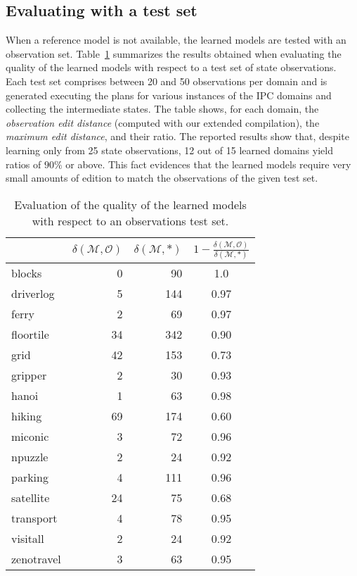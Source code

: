 \subsection{Evaluating with a test set}

When a reference model is not available, the learned models are tested with an observation set. Table~\ref{fig:observationstest} summarizes the results obtained when evaluating the quality of the learned models with respect to a test set of state observations. Each test set comprises between 20 and 50 observations per domain and is generated executing the plans for various instances of the IPC domains and collecting the intermediate states. The table shows, for each domain, the {\em observation edit distance} (computed with our extended compilation), the {\em maximum edit distance}, and their ratio. The reported results show that, despite learning only from 25 state observations, 12 out of 15 learned domains yield ratios of $90\%$ or above. This fact evidences that the learned models require very small amounts of edition to match the observations of the given test set.

\begin{table}[hbt!]
		\begin{center}
                \begin{footnotesize}
			\begin{tabular}{l|r|r|c|}
				& $\delta(\mathcal{M},\mathcal{O})$ & $\delta(\mathcal{M},*)$ & $1-\frac{\delta(\mathcal{M},\mathcal{O})}{\delta(\mathcal{M},*)}$ \\
				\hline
				blocks & 0 & 90 & 1.0 \\
				driverlog & 5 & 144 & 0.97 \\
				ferry & 2 & 69 & 0.97 \\
				floortile & 34 & 342 & 0.90 \\
				grid & 42 & 153 & 0.73 \\
				gripper & 2 & 30 & 0.93 \\
				hanoi & 1 & 63 & 0.98 \\
				hiking & 69 & 174 & 0.60 \\
				miconic & 3 & 72 & 0.96 \\
				npuzzle & 2 & 24 & 0.92 \\
                                parking & 4 & 111 & 0.96 \\
				satellite & 24 & 75 & 0.68 \\
				transport & 4 & 78 & 0.95 \\
				visitall & 2 & 24 & 0.92 \\
				zenotravel & 3 & 63 & 0.95
			\end{tabular}
                        	\end{footnotesize}
		\end{center}
	\caption{\small Evaluation of the quality of the learned models with respect to an observations test set.}
	\label{fig:observationstest}
\end{table}

